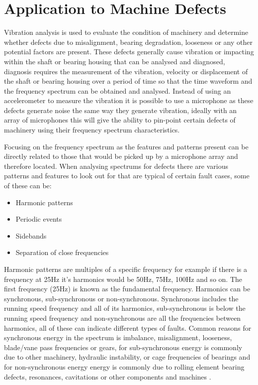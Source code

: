 \documentclass{UoNMCHA}
\numberwithin{equation}{section}
\begin{document}
\newpage
\section{Application to Machine Defects} \label{sec:Machine Defects}

Vibration analysis is used to evaluate the condition of machinery and determine whether defects due to misalignment, bearing degradation, looseness or any other potential factors are present. These defects generally cause vibration or impacting within the shaft or bearing housing that can be analysed and diagnosed, diagnosis requires the measurement of the vibration, velocity or displacement of the shaft or bearing housing over a period of time so that the time waveform and the frequency spectrum can be obtained and analysed. Instead of using an accelerometer to measure the vibration it is possible to use a microphone as these defects generate noise the same way they generate vibration, ideally with an array of microphones this will give the ability to pin-point certain defects of machinery using their frequency spectrum characteristics.

Focusing on the frequency spectrum as the features and patterns present can be directly related to those that would be picked up by a microphone array and therefore located. When analysing spectrums for defects there are various patterns and features to look out for that are typical of certain fault cases, some of these can be:

\begin{itemize}
    \item Harmonic patterns
    \item Periodic events
    \item Sidebands
    \item Separation of close frequencies
\end{itemize}

Harmonic patterns are multiples of a specific frequency for example if there is a frequency at 25Hz it's harmonics would be 50Hz, 75Hz, 100Hz and so on. The first frequency (25Hz) is known as the fundamental frequency.
Harmonics can be synchronous, sub-synchronous or non-synchronous. Synchronous includes the running speed frequency and all of its harmonics, sub-synchronous is below the running speed frequency and non-synchronous are all the frequencies between harmonics, all of these can indicate different types of faults. Common reasons for synchronous energy in the spectrum is imbalance, misalignment, looseness, blade/vane pass frequencies or gears, for sub-synchronous energy is commonly due to other machinery, hydraulic instability, or cage frequencies of bearings and for non-synchronous energy energy is commonly due to rolling element bearing defects, resonances, cavitations or other components and machines \citep{Mob20}.
\end{document}
